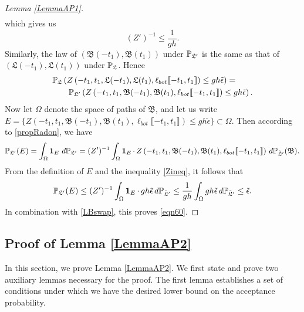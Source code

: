 \begin{proof}[Lemma \ref{LemmaAP1}]
\begin{align*}
	\end{align*}
	which gives us 
	\begin{equation}
	\label{Zineq} (Z')^{-1}\leq \frac{1}{gh}.
	\end{equation}
	Similarly,  the law of $\left(\mathfrak B(-t_1), \mathfrak{B}(t_1)\right)$ under $\mathbb{P}_{\mathfrak L'}$ is the same as that of $\left(\mathfrak L(-t_1), \mathfrak L(t_1)\right)$ under $\mathbb{P}_{\mathfrak L}$. Hence
	\begin{equation}\label{LBswap}
	\begin{split}
	&\mathbb{P}_{\mathfrak L}\left(Z\left(-t_1, t_1, \mathfrak L(-t_1), \mathfrak L(t_1), \ell_{bot}\llbracket -t_1, t_1\rrbracket\right)\leq gh\tilde \epsilon\right)=\\
	&\qquad\mathbb{P}_{\mathfrak L'}\left(Z\left(-t_1, t_1, \mathfrak B(-t_1), \mathfrak B(t_1), \ell_{bot}\llbracket -t_1, t_1\rrbracket\right)\leq gh\tilde \epsilon\right).
	\end{split}
	\end{equation}
	Now let $\Omega$ denote the space of paths of $\mathfrak B$, and let us write $E=\{Z\left(-t_1, t_1, \mathfrak B(-t_1), \mathfrak B(t_1), \ell_{bot}\llbracket -t_1, t_1\rrbracket\right)\leq gh\tilde\epsilon\}\subset \Omega$. Then according to \eqref{propRadon}, we have
	\[
	\mathbb{P}_{\mathfrak L'}(E)=\int_\Omega \operatorname{\mathbf{1}}_E\, d\mathbb{P}_{\mathfrak L'} = (Z')^{-1}\int_\Omega\operatorname{\mathbf{1}}_E \cdot\, Z\left(-t_1, t_1, \mathfrak B(-t_1), \mathfrak B(t_1), \ell_{bot}\llbracket -t_1, t_1\rrbracket\right)\, d\mathbb{P}_{\tilde{\mathfrak{L}}'}(\mathfrak{B}).
	\]
	From the definition of $E$ and the inequality \eqref{Zineq}, it follows that
	\[
	\mathbb{P}_{\mathfrak L'}(E)\leq (Z')^{-1}\int_\Omega \operatorname{\mathbf{1}}_E\cdot\, gh\tilde{\epsilon}\, d\mathbb{P}_{\tilde{\mathfrak{L}}'} \leq \frac{1}{gh}\int_\Omega gh\tilde\epsilon\, d\mathbb{P}_{\tilde{\mathfrak{L}}'}\leq \tilde{\epsilon}.
	\]
	In combination with \eqref{LBswap}, this proves \eqref{eqn60}.
	
\end{proof}

\subsection{Proof of Lemma \ref{LemmaAP2}} \label{sect62} In this section, we prove Lemma \ref{LemmaAP2}. We first state and prove two auxiliary lemmas necessary for the proof. The first lemma establishes a set of conditions under which we have the desired lower bound on the acceptance probability. 

